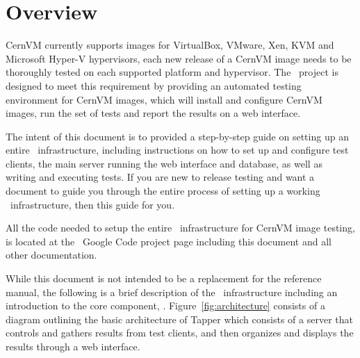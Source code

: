 \chapter{Overview}
\label{sct:overview}

CernVM currently supports images for VirtualBox, VMware, Xen, KVM and Microsoft Hyper-V hypervisors, each new release of a CernVM image needs to be 
thoroughly tested on each supported platform and hypervisor. The \cernvmreleasetesting\ project is designed to meet this requirement by providing an 
automated testing environment for CernVM images, which will install and configure CernVM images, run the set of tests and report the results on a web
interface.

The intent of this document is to provided a step-by-step guide on setting up an entire \cernvmreleasetesting\ infrastructure, including instructions
on how to set up and configure test clients, the main server running the web interface and database, as well as writing and executing tests. If you are
new to release testing and want a document to guide you through the entire process of setting up a working \cernvmreleasetesting\ infrastructure,
then this guide for you.

All the code needed to setup the entire \releasetesting\ infrastructure for CernVM image testing, is located at the \cernvmreleasetesting\ Google Code project
page\cite{GCreleasetesting} including this document and all other documentation. 

While this document is not intended to be a replacement for the reference manual, the following is a brief description of the \releasetesting\ infrastructure 
including an introduction to the core component, \amdtapper\cite{tapper}. Figure~\ref{fig:architecture} consists of a diagram outlining the basic architecture
of Tapper which consists of a server that controls and gathers results from test clients, and then organizes and 
displays the results through a web interface.\newline